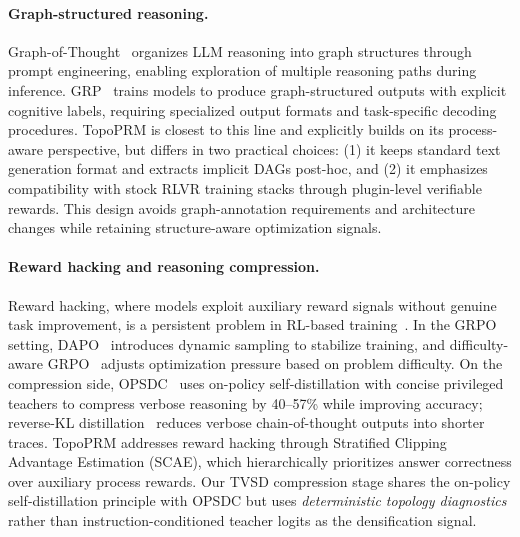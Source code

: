\paragraph{Graph-structured reasoning.}
Graph-of-Thought~\citep{besta2024graph} organizes LLM reasoning into
graph structures through prompt engineering, enabling exploration of
multiple reasoning paths during inference.
GRP~\citep{grp2025} trains models to produce graph-structured outputs
with explicit cognitive labels, requiring specialized output formats and
task-specific decoding procedures. TopoPRM is closest to this line and
explicitly builds on its process-aware perspective, but differs in two
practical choices: (1) it keeps standard text generation format and
extracts implicit DAGs post-hoc, and (2) it emphasizes compatibility with
stock RLVR training stacks through plugin-level verifiable rewards. This
design avoids graph-annotation requirements and architecture changes while
retaining structure-aware optimization signals.

\paragraph{Reward hacking and reasoning compression.}
Reward hacking, where models exploit auxiliary reward signals without
genuine task improvement, is a persistent problem in RL-based
training~\citep{Denison2024SycophancyTS}. In the GRPO setting,
DAPO~\citep{dapo2026} introduces dynamic sampling to stabilize training,
and difficulty-aware GRPO~\citep{difficultyGRPO2026} adjusts
optimization pressure based on problem difficulty. On the compression
side, OPSDC~\citep{opsdc2026} uses on-policy self-distillation with
concise privileged teachers to compress verbose reasoning by 40--57\%
while improving accuracy;
reverse-KL distillation~\citep{hinton2015distilling} reduces verbose
chain-of-thought outputs into shorter traces. TopoPRM
addresses reward hacking through Stratified
Clipping Advantage Estimation (SCAE), which hierarchically prioritizes answer
correctness over auxiliary process rewards. Our TVSD compression stage
shares the on-policy self-distillation principle with OPSDC but uses
\emph{deterministic topology diagnostics} rather than instruction-conditioned
teacher logits as the densification signal.

